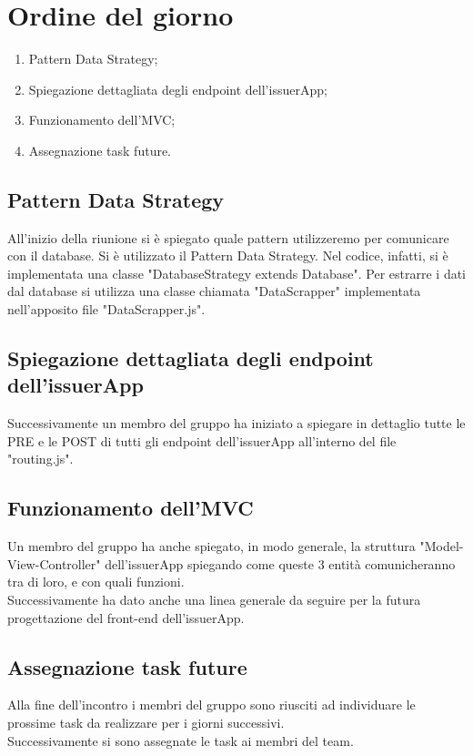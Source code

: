 \section{Ordine del giorno}
\begin{enumerate}
\item Pattern Data Strategy;
\item Spiegazione dettagliata degli endpoint dell'issuerApp;
\item Funzionamento dell'MVC;
\item Assegnazione task future.
\end{enumerate}

\subsection{Pattern Data Strategy}
All'inizio della riunione si è spiegato quale pattern utilizzeremo per comunicare con il database. Si è utilizzato il Pattern Data Strategy. Nel codice, infatti, si è implementata una classe "DatabaseStrategy extends Database". Per estrarre i dati dal database si utilizza una classe chiamata "DataScrapper" implementata nell'apposito file "DataScrapper.js".

\subsection{Spiegazione dettagliata degli endpoint dell'issuerApp}
Successivamente un membro del gruppo ha iniziato a spiegare in dettaglio tutte le PRE e le POST di tutti gli endpoint dell'issuerApp all'interno del file "routing.js".

\subsection{Funzionamento dell'MVC}
Un membro del gruppo ha anche spiegato, in modo generale, la struttura "Model-View-Controller" dell'issuerApp spiegando come queste 3 entità comunicheranno tra di loro, e con quali funzioni.\\
Successivamente ha dato anche una linea generale da seguire per la futura progettazione del front-end dell'issuerApp. 

\subsection{Assegnazione task future}
Alla fine dell'incontro i membri del gruppo sono riusciti ad individuare le prossime task da realizzare per i giorni successivi.\\
Successivamente si sono assegnate le task ai membri del team.